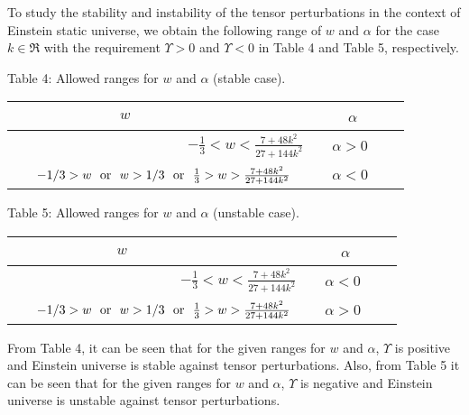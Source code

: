 \documentclass[showpacs,amsmath,nofootinbib,amssymb,epsfig]{revtex4}
\begin{document}
To study the stability and instability of the tensor perturbations in the context of Einstein static universe, we obtain the following range of $w$ and $\alpha$  for the case $k\in\Re$
with the requirement $\Upsilon>0$ and $\Upsilon<0$ in Table 4 and Table 5, respectively.
\vspace{5mm}
\begin{center}
{\scriptsize{ Table 4: }}\hspace{-2mm} {\scriptsize Allowed ranges for $w$ and $\alpha$ (stable case).}\\
    \begin{tabular}{|l| l |l |  p{900mm} }
    \hline
   {\footnotesize$~~~~~~~~~~~~~~~~~~~~~~~~~~~~~~~~~w$ }& ~~{\footnotesize~ $\alpha$ }  \\ \hline
{\footnotesize ~~~~~~~~~~~~~~~~~~~~~~~~$-\frac{1}{3} < w<\frac{7+48k^{2}}{27+144k^{2}} $} & ~~{\footnotesize $\alpha>0$} \\\hline
 {\footnotesize ~~~$-1/3 > w ~~ {\rm or}~~ w > 1/3 ~~ {\rm or}~~  \frac{1}{3} > w>\frac{7+48k^{2}}{27+144k^{2}}$} & ~{\footnotesize  ~$\alpha<0$}
\\ \hline
    \end{tabular}
\end{center}
\begin{center}
{\scriptsize{ Table 5: }}\hspace{-2mm} {\scriptsize Allowed ranges for $w$ and $\alpha$ (unstable case).}\\
    \begin{tabular}{|l| l |l |  p{800mm} }
    \hline
   {\footnotesize$~~~~~~~~~~~~~~~~~~~~~~~~~~~~~~~~w$ }& ~~{\footnotesize~ $\alpha$ }  \\ \hline
{\footnotesize ~~~~~~~~~~~~~~~~~~~~~~~$-\frac{1}{3} < w<\frac{7+48k^{2}}{27+144k^{2}} $} & ~~{\footnotesize $\alpha<0$} \\\hline
 {\footnotesize ~~~$-1/3 > w ~~ {\rm or}~~ w > 1/3 ~~ {\rm or}~~  \frac{1}{3} > w>\frac{7+48k^{2}}{27+144k^{2}}$} & ~{\footnotesize  ~$\alpha>0$}
\\ \hline
    \end{tabular}
\end{center}

From Table 4, it can be seen that for the given ranges for $w$ and $\alpha$, $\Upsilon$ is positive and Einstein universe is stable against tensor perturbations. Also, from Table 5 it can be seen that for the given ranges for $w$ and $\alpha$, $\Upsilon$ is negative and Einstein universe is unstable against tensor perturbations.
\end{document}
